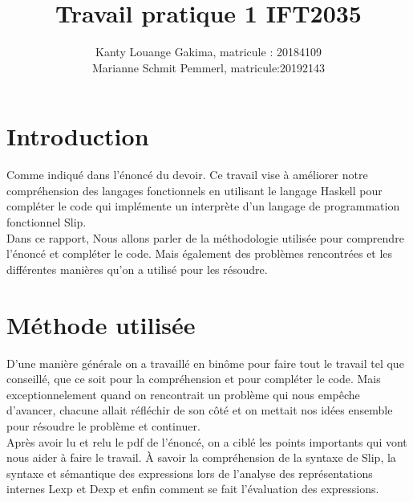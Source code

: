 \documentclass{article}
\title{Travail pratique 1 IFT2035}
\author{Kanty Louange Gakima, matricule : 20184109 \\ Marianne Schmit Pemmerl, matricule:20192143 }
\begin{document}
\maketitle

\newcommand \mML {\ensuremath\mu\textsl{ML}}
\newcommand \kw [1] {\textsf{#1}}
\newcommand \id [1] {\textsl{#1}}
\newcommand \punc [1] {\kw{`#1'}}
\newcommand \str [1] {\texttt{"#1"}}
\newenvironment{outitemize}{
  \begin{itemize}
  \let \origitem \item \def \item {\origitem[]\hspace{-18pt}}
}{
  \end{itemize}
}
\newcommand \Align [2][t] {
  \begin{array}[#1]{@{}l}
    #2
  \end{array}}

\section{Introduction}


Comme indiqué dans l'énoncé du devoir. Ce travail vise à améliorer notre compréhension des langages fonctionnels en utilisant le langage Haskell pour compléter le code qui implémente un interprète d'un langage de programmation fonctionnel Slip.\\ 
Dans ce rapport, Nous allons parler de la méthodologie utilisée pour comprendre l'énoncé et compléter le code. Mais également des problèmes rencontrées et les différentes manières qu'on a utilisé pour les résoudre.

\section{Méthode utilisée}
D'une manière générale on a travaillé en binôme pour faire tout le travail tel que conseillé, que ce soit pour la compréhension et pour compléter le code. Mais exceptionnelement quand on rencontrait un problème qui nous empêche d'avancer, chacune allait réfléchir de son côté et on mettait nos idées ensemble pour résoudre le problème et continuer.\\

Après avoir lu et relu le pdf de l'énoncé, on a ciblé les points importants qui vont nous aider à faire le travail.
À savoir la compréhension de la syntaxe de Slip, la syntaxe et sémantique des expressions lors de l’analyse des représentations internes Lexp et Dexp et enfin comment se fait l'évaluation des expressions. 
\end{document}
